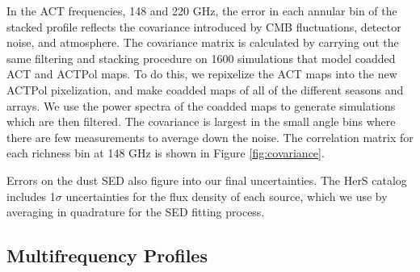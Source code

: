 \documentclass[a4paper,fleqn,usenatbib]{mnras}
\begin{document}
In the ACT frequencies, 148 and 220 GHz, the error in each annular bin of the stacked profile reflects the covariance introduced by CMB fluctuations, detector noise, and atmosphere. The covariance matrix is calculated by carrying out the same filtering and stacking procedure on 1600 simulations that model coadded ACT and ACTPol maps. To do this, we repixelize the ACT maps into the new ACTPol pixelization, and make coadded maps of all of the different seasons and arrays. We use the power spectra of the coadded maps to generate simulations which are then filtered. The covariance is largest in the small angle bins where there are few measurements to average down the noise. The correlation matrix for each richness bin at 148 GHz is shown in Figure \ref{fig:covariance}.  

Errors on the dust SED also figure into our final uncertainties.  
The HerS catalog includes 1$\sigma$ uncertainties for the flux density of each source, which we use by averaging in quadrature for the SED fitting process. 

\subsection{Multifrequency Profiles} \label{sec:multifreqprof}
\end{document}
